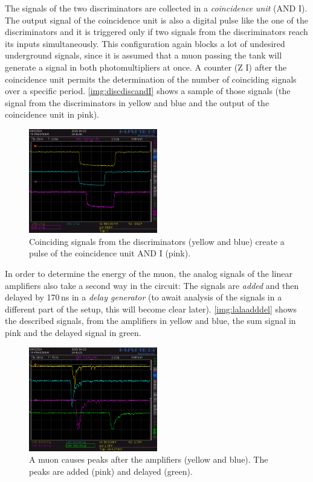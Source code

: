 The signals of the two discriminators are collected in a \emph{coincidence unit} (AND I).
The output signal of the coincidence unit is also a digital pulse like the one of the discriminators
and it is triggered only if two signals from the discriminators reach its inputs simultaneously.
This configuration again blocks a lot of undesired underground signals,
since it is assumed that a muon passing the tank will generate a signal in both photomultipliers at once.
A counter (Z I) after the coincidence unit permits the determination of the number of coinciding signals
over a specific period.
\autoref{img:discdiscandI} shows a sample of those signals
(the signal from the discriminators in yellow and blue and the output of the coincidence unit in pink).

\begin{figure}[H]
\begin{center}
  \includegraphics[width=0.5\textwidth]{../img/S0012.PNG}
  \caption{Coinciding signals from the discriminators (yellow and blue) create a pulse
  of the coincidence unit AND I (pink).}
  \label{img:discdiscandI}
\end{center}
\end{figure}

In order to determine the energy of the muon, the analog signals of the linear amplifiers
also take a second way in the circuit:
The signals are \emph{added} and then delayed by 170\,ns in a \emph{delay generator}
(to await analysis of the signals in a different part of the setup, this will become clear later).
\autoref{img:lalaadddel} shows the described signals, from the amplifiers in yellow and blue,
the sum signal in pink and the delayed signal in green.

\begin{figure}[H]
\begin{center}
  \includegraphics[width=0.5\textwidth]{../img/S0013.PNG}
  \caption{A muon causes peaks after the amplifiers (yellow and blue). The peaks are added (pink)
  and delayed (green).}
  \label{img:lalaadddel}
\end{center}
\end{figure}

